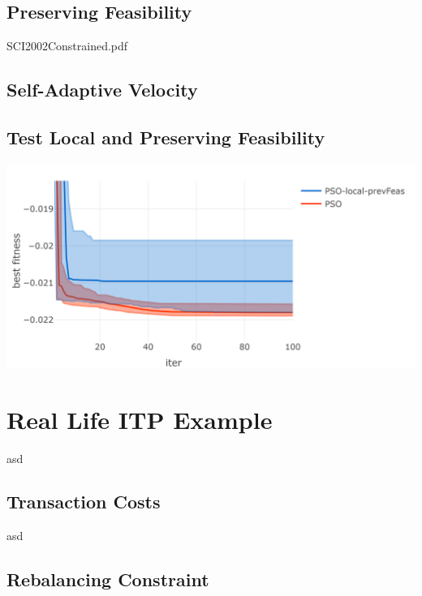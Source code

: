 \documentclass[
  oneside]{book}
\begin{document}
\hypertarget{preserving-feasibility}{%
\section{Preserving Feasibility}\label{preserving-feasibility}}

SCI2002Constrained.pdf

\hypertarget{self-adaptive-velocity}{%
\section{Self-Adaptive Velocity}\label{self-adaptive-velocity}}

\hypertarget{test-local-and-preserving-feasibility}{%
\section{Test Local and Preserving Feasibility}\label{test-local-and-preserving-feasibility}}

\includegraphics{Master_Thesis_files/figure-latex/unnamed-chunk-14-1.png}

\hypertarget{real-life-itp-example}{%
\chapter{Real Life ITP Example}\label{real-life-itp-example}}

asd

\hypertarget{transaction-costs}{%
\section{Transaction Costs}\label{transaction-costs}}

asd

\hypertarget{rebalancing-constraint}{%
\section{Rebalancing Constraint}\label{rebalancing-constraint}}
\end{document}
